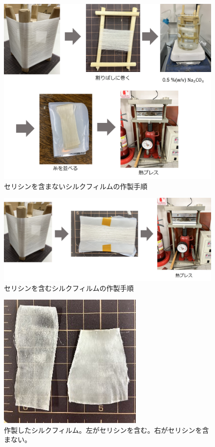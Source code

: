 \documentclass[dvipdfmx,12pt,a4paper]{jreport}
\begin{document}
		\begin{figure}[h]
			\centering
			\includegraphics[scale=0.65]{試料作製手順.jpg}
			\caption{セリシンを含まないシルクフィルムの作製手順}
			\label{セリシンを含まない試料作製手順}
		\end{figure}
		\newpage
		\begin{figure}[h]
			\centering
			\includegraphics[width=\linewidth]{試料作製手順2.jpg}
			\caption{セリシンを含むシルクフィルムの作製手順}
			\label{セリシンを含むフィルム作製手順}
		\end{figure}
		\begin{figure}[h]
			\centering
			\includegraphics[scale=1]{試料.jpg}
			\caption{作製したシルクフィルム。左がセリシンを含む。右がセリシンを含まない。}
			\label{試料外観}
		\end{figure}
\end{document}
